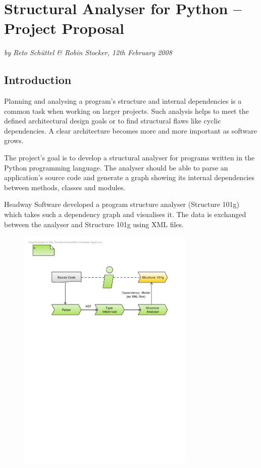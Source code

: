\documentclass[12pt,halfparskip]{scrartcl}
\begin{document}
\pagestyle{plain}

\section*{Structural Analyser for Python – Project Proposal}
\vspace{-0.5cm}

\emph{by Reto Schüttel \& Robin Stocker, 12th February 2008}

\vspace{-0.3cm}

\subsection*{Introduction}

Planning and analysing a program's structure and internal dependencies is a common task when working on larger projects. Such analysis helps to meet the defined architectural design goals or to find structural flaws like cyclic dependencies. A clear architecture becomes more and more important as software grows.

The project's goal is to develop a structural analyser for programs written in the Python programming language. The analyser should be able to parse an application's source code and generate a graph showing its internal dependencies between methods, classes and modules.

Headway Software developed a program structure analyser (Structure 101g) which takes such a dependency graph and visualises it. The data is exchanged between the analyser and Structure 101g using XML files.

\begin{figure}[h] \centering
\includegraphics[width=0.75\textwidth]{big_picture}
\end{figure}
\end{document}
